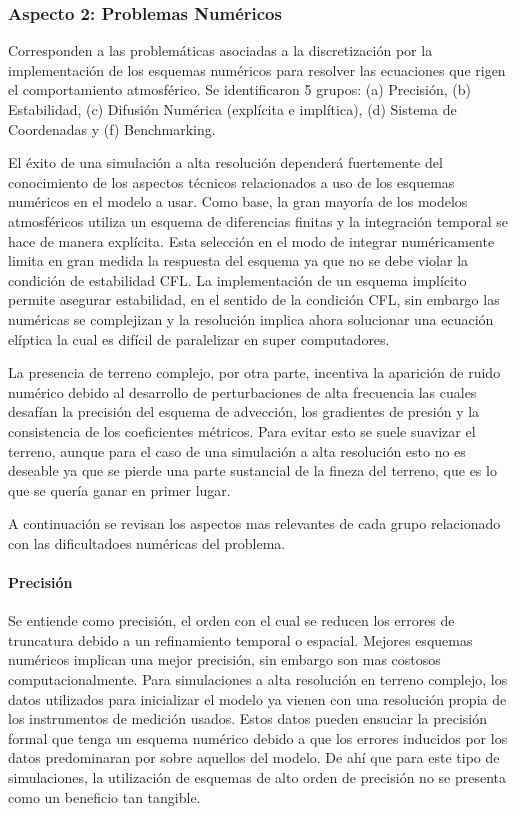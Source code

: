 \subsubsection{Aspecto 2: Problemas Numéricos}
Corresponden a las problemáticas asociadas a la discretización por la implementación de los esquemas numéricos para resolver las ecuaciones que rigen el comportamiento atmosférico. Se identificaron 5 grupos: (a) Precisión, (b) Estabilidad, (c) Difusión Numérica (explícita e implítica), (d) Sistema de Coordenadas y (f) Benchmarking.

El éxito de una simulación a alta resolución dependerá fuertemente del conocimiento de los aspectos técnicos relacionados a uso de los esquemas numéricos en el modelo a usar. Como base, la gran mayoría de los modelos atmosféricos utiliza un esquema de diferencias finitas y la integración temporal se hace de manera explícita. Esta selección en el modo de integrar numéricamente limita en gran medida la respuesta del esquema ya que no se debe violar la condición de estabilidad CFL. La implementación de un esquema implícito permite asegurar estabilidad, en el sentido de la condición CFL, sin embargo las numéricas se complejizan y la resolución implica ahora solucionar una ecuación elíptica la cual es difícil de paralelizar en super computadores.

La presencia de terreno complejo, por otra parte, incentiva la aparición de ruido numérico debido al desarrollo de perturbaciones de alta frecuencia las cuales desafían la precisión del esquema de advección, los gradientes de presión y la consistencia de los coeficientes métricos. Para evitar esto se suele suavizar el terreno, aunque para el caso de una simulación a alta resolución esto no es deseable ya que se pierde una parte sustancial de la fineza del terreno, que es lo que se quería ganar en primer lugar. 

A continuación se revisan los aspectos mas relevantes de cada grupo relacionado con las dificultadoes numéricas del problema.

\paragraph{Precisión} Se entiende como precisión, el orden con el cual se reducen los errores de truncatura debido a un refinamiento temporal o espacial. Mejores esquemas numéricos implican una mejor precisión, sin embargo son mas costosos computacionalmente. Para simulaciones a alta resolución en terreno complejo, los datos utilizados para inicializar el modelo ya vienen con una resolución propia de los instrumentos de medición usados. Estos datos pueden ensuciar la precisión formal que tenga un esquema numérico debido a que los errores inducidos por los datos predominaran por sobre aquellos del modelo. De ahí que para este tipo de simulaciones, la utilización de esquemas de alto orden de precisión no se presenta como un beneficio tan tangible.


